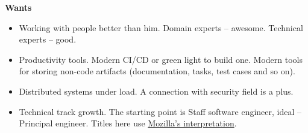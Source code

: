 \documentclass[final]{letter}
\begin{document}
{\bf Wants}
\begin{itemize}
  \item Working with people better than him. Domain experts -- awesome. Technical experts -- good.
  \item Productivity tools. Modern CI/CD or green light to build one. Modern tools for storing non-code artifacts (documentation, tasks, test cases and so on).
  \item Distributed systems under load. A connection with security field is a plus.
  \item Technical track growth. The starting point is Staff software engineer, ideal -- Principal engineer.
   Titles here use \href{https://glennsantos.com/wp-content/uploads/2021/03/MozillaICCareerLevels.jpeg}{Mozilla's interpretation}.
\end{itemize}
\end{document}
